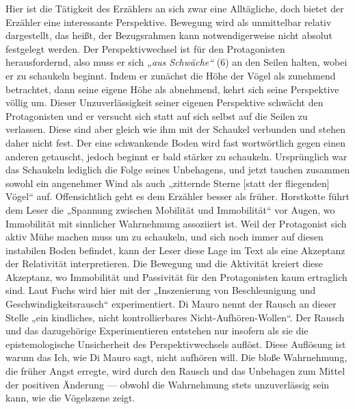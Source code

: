 \documentclass[12pt,a4paper]{article}
\begin{document}
Hier ist die Tätigkeit des Erzählers an sich zwar eine Alltägliche, doch bietet der Erzähler eine interessante Perspektive. Bewegung wird als unmittelbar relativ dargestellt, das heißt, der Bezugsrahmen kann notwendigerweise nicht absolut festgelegt werden. Der Perspektivwechsel ist für den Protagonisten herausfordernd, also muss er sich \textit{„aus Schwäche“} (6) an den Seilen halten, wobei er zu schaukeln beginnt. Indem er zunächst die Höhe der Vögel als zunehmend betrachtet, dann seine eigene Höhe als abnehmend, kehrt sich seine Perspektive völlig um. Dieser Unzuverlässigkeit seiner eigenen Perspektive schwächt den Protagonisten und er versucht sich statt auf sich selbst auf die Seilen zu verlassen. Diese sind aber gleich wie ihm mit der Schaukel verbunden und stehen daher nicht fest. Der eine schwankende Boden wird fast wortwörtlich gegen einen anderen getauscht, jedoch beginnt er bald stärker zu schaukeln. Ursprünglich war das Schaukeln lediglich die Folge seines Unbehagens, und jetzt tauchen zusammen sowohl ein angenehmer Wind als auch „zitternde Sterne [statt der fliegenden] Vögel“ auf. Offensichtlich geht es dem Erzähler besser als früher. Horstkotte führt dem Leser die „Spannung zwischen Mobilität und Immobilität“\autocite[128]{horstkotte2014} vor Augen, wo Immobilität mit sinnlicher Wahrnehmung assoziiert ist. Weil der Protagonist sich aktiv Mühe machen muss um zu schaukeln, und sich noch immer auf diesen instabilen Boden befindet, kann der Leser diese Lage im Text als eine Akzeptanz der Relativität interpretieren. Die Bewegung und die Aktivität kreiert diese Akzeptanz, wo Immobilität und Passivität für den Protagonisten kaum ertraglich sind. Laut Fuchs wird hier mit der „Inszenierung von Beschleunigung und Geschwindigkeitsrausch“\autocite[59]{fuchs} experimentiert. Di Mauro nennt der Rausch an dieser Stelle „ein kindliches, nicht kontrollierbares Nicht-Aufhören-Wollen“.\autocite[56]{mauro} Der Rausch und das dazugehörige Experimentieren entstehen nur insofern als sie die epistemologische Unsicherheit des Perspektivwechsels auflöst. Diese Auflösung ist warum das Ich, wie Di Mauro sagt, nicht aufhören will. Die bloße Wahrnehmung, die früher Angst erregte, wird durch den Rausch und das Unbehagen zum Mittel der positiven Änderung — obwohl die Wahrnehmung stets unzuverlässig sein kann, wie die Vögelszene zeigt.\par 
%
\end{document}
